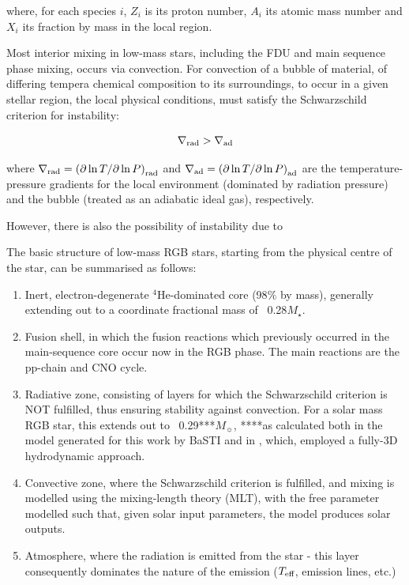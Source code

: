 \documentclass[usenatbib]{mnras}
\begin{document}
where, for each species $i$, $Z_{i}$ is its proton number, $A_{i}$ its atomic mass number and $X_{i}$ its fraction by mass in the local region.

Most interior mixing in low-mass stars, including the FDU and main sequence phase mixing, occurs via convection. For convection of a bubble of material, of differing tempera chemical composition to its surroundings, to occur in a given stellar region, the local physical conditions, must satisfy the Schwarzschild criterion for instability:

\begin{equation}
\nabla _{\textnormal{rad}} > \nabla _{\textnormal{ad}}
\end{equation}

where $\nabla _{\textnormal{rad}} = \left(\partial\ln T / \partial\ln P \right)_{\textnormal{rad}}$ and $\nabla _{\textnormal{ad}} = \left(\partial\ln T / \partial\ln P \right)_{\textnormal{ad}}$ are the temperature-pressure gradients for the local environment (dominated by radiation pressure) and the bubble (treated as an adiabatic ideal gas), respectively.

However, there is also the possibility of instability due to 

The basic structure of low-mass  RGB stars, starting from the physical centre of the star, can be summarised as follows:

\begin{enumerate}
\item Inert, electron-degenerate $^{4}$He-dominated core (98$\%$ by mass), generally extending out to a coordinate fractional mass of ~0.28$M_{\star}$.
\item Fusion shell, in which the fusion reactions which previously occurred in the main-sequence core occur now in the RGB phase. The main reactions are the pp-chain and CNO cycle.
\item Radiative zone, consisting of layers for which the Schwarzschild criterion is NOT fulfilled, thus ensuring stability against convection. For a solar mass RGB star, this extends out to ~0.29***$M_{\sun}$, ****as calculated both in the model generated for this work by BaSTI and in \citep{2006Sci...314.1580E}, which, employed a fully-3D hydrodynamic approach.
\item Convective zone, where the Schwarzschild criterion is fulfilled, and mixing is modelled using the mixing-length theory (MLT), with the free parameter modelled such that, given solar input parameters, the model produces solar outputs.
\item Atmosphere, where the radiation is emitted from the star - this layer consequently dominates the nature of the emission ($T_{\textnormal{eff}}$, emission lines, etc.)
\end{enumerate}
\end{document}
